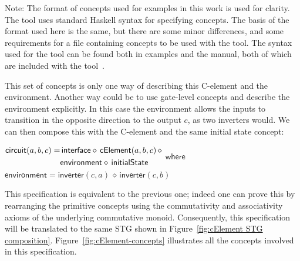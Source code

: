 \documentclass[british,compsoc]{IEEEtran}
\begin{document}
Note: The format of concepts used for examples in this work is used for clarity.
The tool uses standard Haskell syntax for specifying concepts.
The basis of the format used here is the same, but there are some minor differences, and some
requirements for a file containing concepts to be used with the tool.
The syntax used for the tool can be found both in examples and the manual, both of which are included with the tool~\cite{2016_concepts_github}.


This set of concepts is only one way of describing this C-element
and the environment. Another way could be to use gate-level concepts
and describe the environment explicitly. In this case the environment
allows the inputs to transition in the opposite direction to the output
$c$, as two inverters would. We can then compose this with the C-element
and the same initial state concept:



\begin{minipage}[t]{1\columnwidth}%
$\begin{aligned}\mathsf{circuit}(a, b, c)=&\mathsf{\,interface}\diamond\mathsf{\,cElement}(a, b, c)\, \diamond \\
&\mathsf{environment}\diamond\,\mathsf{initialState}
\end{aligned}\\
$
$\mathsf{where}$\\
$\mathsf{environment}=\mathsf{inverter} (c, a) \,\diamond\,\mathsf{inverter}(c, b)$
\\
\end{minipage}
This specification is equivalent to the previous one; indeed one can
prove this by rearranging the primitive concepts using the commutativity
and associativity axioms of the underlying commutative monoid. Consequently,
this specification will be translated to the same STG shown in Figure~\ref{fig:cElement STG  composition}.
Figure~\ref{fig:cElement-concepts} illustrates all the concepts
involved in this specification.
\end{document}
